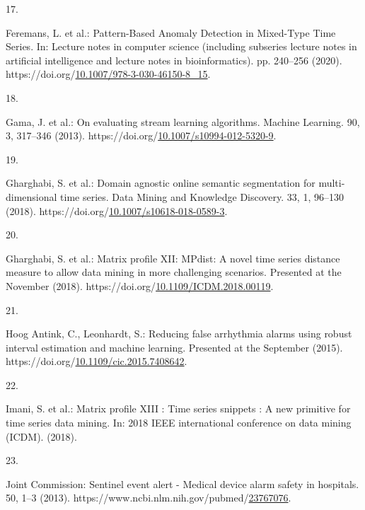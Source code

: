 \documentclass[runningheads]{llncs}
\newlength{\cslhangindent}
\newlength{\csllabelwidth}
\newenvironment{CSLReferences}[2] %
 {%
  \setlength{\parindent}{0pt}
  \ifodd #1 \everypar{\setlength{\hangindent}{\cslhangindent}}\ignorespaces\fi
  \ifnum #2 > 0
  \setlength{\parskip}{#2\baselineskip}
  \fi
 }%
 {}
\newcommand{\CSLLeftMargin}[1]{\parbox[t]{\csllabelwidth}{#1}}
\newcommand{\CSLRightInline}[1]{\parbox[t]{\linewidth - \csllabelwidth}{#1}\break}
\begin{document}
\begin{CSLReferences}{0}{0}
\leavevmode{}%
\CSLLeftMargin{17. }
\CSLRightInline{Feremans, L. et al.: {Pattern-Based Anomaly Detection in Mixed-Type Time Series}. In: Lecture notes in computer science (including subseries lecture notes in artificial intelligence and lecture notes in bioinformatics). pp. 240--256 (2020). https://doi.org/\href{https://doi.org/10.1007/978-3-030-46150-8_15}{10.1007/978-3-030-46150-8\_15}.}

\leavevmode{}%
\CSLLeftMargin{18. }
\CSLRightInline{Gama, J. et al.: {On evaluating stream learning algorithms}. Machine Learning. 90, 3, 317--346 (2013). https://doi.org/\href{https://doi.org/10.1007/s10994-012-5320-9}{10.1007/s10994-012-5320-9}.}

\leavevmode{}%
\CSLLeftMargin{19. }
\CSLRightInline{Gharghabi, S. et al.: Domain agnostic online semantic segmentation for multi-dimensional time series. Data Mining and Knowledge Discovery. 33, 1, 96--130 (2018). https://doi.org/\href{https://doi.org/10.1007/s10618-018-0589-3}{10.1007/s10618-018-0589-3}.}

\leavevmode{}%
\CSLLeftMargin{20. }
\CSLRightInline{Gharghabi, S. et al.: Matrix profile XII: MPdist: A novel time series distance measure to allow data mining in more challenging scenarios. Presented at the November (2018). https://doi.org/\href{https://doi.org/10.1109/ICDM.2018.00119}{10.1109/ICDM.2018.00119}.}

\leavevmode{}%
\CSLLeftMargin{21. }
\CSLRightInline{Hoog Antink, C., Leonhardt, S.: Reducing false arrhythmia alarms using robust interval estimation and machine learning. Presented at the September (2015). https://doi.org/\href{https://doi.org/10.1109/cic.2015.7408642}{10.1109/cic.2015.7408642}.}

\leavevmode{}%
\CSLLeftMargin{22. }
\CSLRightInline{Imani, S. et al.: Matrix profile XIII : Time series snippets : A new primitive for time series data mining. In: 2018 IEEE international conference on data mining (ICDM). (2018).}

\leavevmode{}%
\CSLLeftMargin{23. }
\CSLRightInline{Joint Commission: {Sentinel event alert - Medical device alarm safety in hospitals.} 50, 1--3 (2013). https://www.ncbi.nlm.nih.gov/pubmed/\href{https://www.ncbi.nlm.nih.gov/pubmed/23767076}{23767076}.}


\end{CSLReferences}
\end{document}
